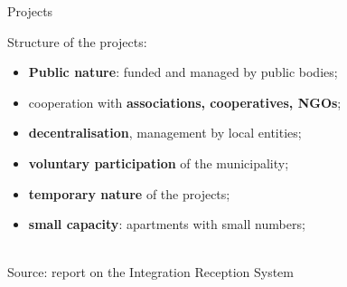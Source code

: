 \documentclass[xcolor={dvipsnames}]{beamer}
\begin{document}
\begin{frame}{Projects}

Structure of the projects: \\

\vspace{5}

\begin{itemize}
\justifying
    \item \textbf{Public nature}: funded and managed by public bodies; \\
    \vspace{5}
    
    \item cooperation with \textbf{associations, cooperatives, NGOs}; \\
    \vspace{5}
    
    \item \textbf{decentralisation}, management by local entities; \\
    \vspace{5}
    
    \item \textbf{voluntary participation} of the municipality; \\
    \vspace{5}
    
    \item \textbf{temporary nature} of the projects; \\
    \vspace{5}
    
    \item \textbf{small capacity}: apartments with small numbers;
\end{itemize}
\\

\vspace{10}
\footnotesize
Source: report on the Integration Reception System \citep{cittalia2022}
\end{frame}
\end{document}

